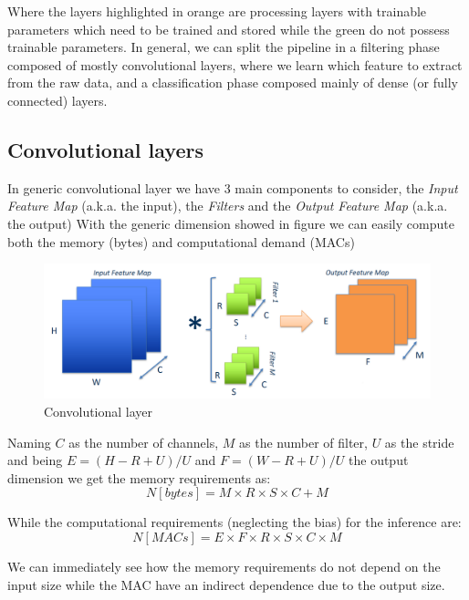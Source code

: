 \documentclass{article}
\begin{document}
    Where the layers highlighted in orange are processing layers with trainable parameters which need to be trained and stored while the green do not possess trainable parameters. In general, we can split the pipeline in a filtering phase composed of mostly convolutional layers, where we learn which feature to extract from the raw data, 
    and a classification phase composed mainly of dense (or fully connected) layers.

    \subsection{Convolutional layers}
      In generic convolutional layer we have 3 main components to consider, the \emph{Input Feature Map} (a.k.a. the input), the \emph{Filters} and the \emph{Output Feature Map} (a.k.a. the output)
      With the generic dimension showed in figure we can easily compute both the memory (bytes) and computational demand (MACs)
      
      \begin{figure}[H]
        \includegraphics[scale=0.35]{../Images/ConvLayers.png}
        \centering
        \caption{Convolutional layer}
      \end{figure}
      
      Naming $C$ as the number of channels, $M$ as the number of filter, $U$ as the stride and being  $E = (H-R+U)/U$ and $F = (W-R+U)/U$ the output dimension we get the memory requirements as:
      \begin{equation}
        N [bytes] = M \times R \times S \times C + M
      \end{equation}

      While the computational requirements (neglecting the bias) for the inference are:
      \begin{equation}
        N [MACs] = E \times F\times R\times S\times C\times M
      \end{equation}

      We can immediately see how the memory requirements do not depend on the input size while the MAC have an indirect dependence due to the output size.
\end{document}
